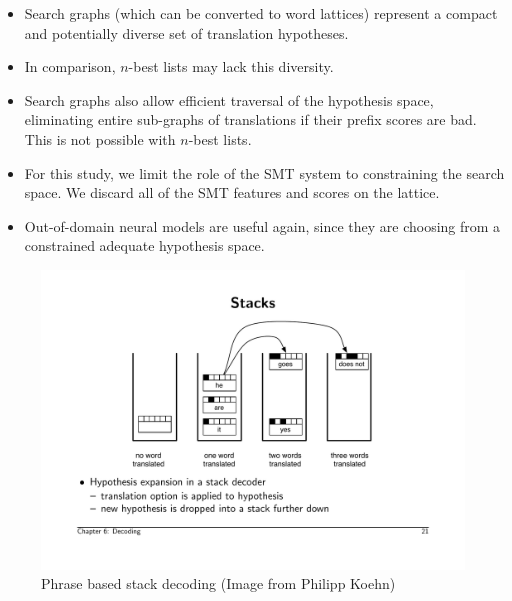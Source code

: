 \documentclass[landscape]{jhuslides3C}
\begin{document}
\begin{itemize}
\item Search graphs (which can be converted to word lattices) represent a compact and potentially diverse set of translation hypotheses.
\item	In comparison, $n$-best lists may lack this diversity.
\item Search graphs also allow efficient traversal of the hypothesis space, eliminating entire sub-graphs of translations if their prefix scores are bad. This is not possible with $n$-best lists.
\item For this study, we limit the role of the SMT system to constraining the search space. We discard all of the SMT features and scores on the lattice.
\item Out-of-domain neural models are useful again, since they are choosing from a constrained adequate hypothesis space.
\end{itemize}

\begin{figure}
\begin{center}
\includegraphics[scale=1.2]{images/stack1.pdf}
\caption{Phrase based stack decoding ({\tiny Image from Philipp Koehn})}
\end{center}
\end{figure}
\end{document}
